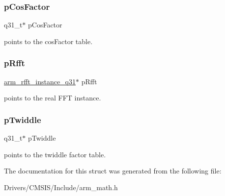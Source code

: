 \subsubsection{\texorpdfstring{p\+Cos\+Factor}{pCosFactor}}
{\footnotesize\ttfamily q31\+\_\+t$\ast$ p\+Cos\+Factor}

points to the cos\+Factor table. \mbox{\label{structarm__dct4__instance__q31_a16c74f8496e1691e62da3c57e0c676eb}} 
\subsubsection{\texorpdfstring{p\+Rfft}{pRfft}}
{\footnotesize\ttfamily \mbox{\hyperlink{structarm__rfft__instance__q31}{arm\+\_\+rfft\+\_\+instance\+\_\+q31}}$\ast$ p\+Rfft}

points to the real F\+FT instance. \mbox{\label{structarm__dct4__instance__q31_a2505b7d5ec077b244c712797a5253b6d}} 
\subsubsection{\texorpdfstring{p\+Twiddle}{pTwiddle}}
{\footnotesize\ttfamily q31\+\_\+t$\ast$ p\+Twiddle}

points to the twiddle factor table. 

The documentation for this struct was generated from the following file\+:\begin{DoxyCompactItemize}
\item 
Drivers/\+C\+M\+S\+I\+S/\+Include/arm\+\_\+math.\+h\end{DoxyCompactItemize}

